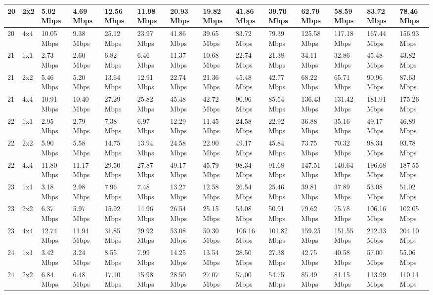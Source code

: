 \documentclass[12pt]{article}
\begin{document}
\begin{longtable}[c]{|l|l|l|l|l|l|l|l|l|l|l|l|l|l|}
20 & 2x2 & 5.02 Mbps & 4.69 Mbps & 12.56 Mbps & 11.98 Mbps & 20.93 Mbps & 19.82 Mbps & 41.86 Mbps & 39.70 Mbps & 62.79 Mbps & 58.59 Mbps & 83.72 Mbps & 78.46 Mbps \\ \hline
20 & 4x4 & 10.05 Mbps & 9.38 Mbps & 25.12 Mbps & 23.97 Mbps & 41.86 Mbps & 39.65 Mbps & 83.72 Mbps & 79.39 Mbps & 125.58 Mbps & 117.18 Mbps & 167.44 Mbps & 156.93 Mbps \\ \hline
21 & 1x1 & 2.73 Mbps & 2.60 Mbps & 6.82 Mbps & 6.46 Mbps & 11.37 Mbps & 10.68 Mbps & 22.74 Mbps & 21.38 Mbps & 34.11 Mbps & 32.86 Mbps & 45.48 Mbps & 43.82 Mbps \\ \hline
21 & 2x2 & 5.46 Mbps & 5.20 Mbps & 13.64 Mbps & 12.91 Mbps & 22.74 Mbps & 21.36 Mbps & 45.48 Mbps & 42.77 Mbps & 68.22 Mbps & 65.71 Mbps & 90.96 Mbps & 87.63 Mbps \\ \hline
21 & 4x4 & 10.91 Mbps & 10.40 Mbps & 27.29 Mbps & 25.82 Mbps & 45.48 Mbps & 42.72 Mbps & 90.96 Mbps & 85.54 Mbps & 136.43 Mbps & 131.42 Mbps & 181.91 Mbps & 175.26 Mbps \\ \hline
22 & 1x1 & 2.95 Mbps & 2.79 Mbps & 7.38 Mbps & 6.97 Mbps & 12.29 Mbps & 11.45 Mbps & 24.58 Mbps & 22.92 Mbps & 36.88 Mbps & 35.16 Mbps & 49.17 Mbps & 46.89 Mbps \\ \hline
22 & 2x2 & 5.90 Mbps & 5.58 Mbps & 14.75 Mbps & 13.94 Mbps & 24.58 Mbps & 22.90 Mbps & 49.17 Mbps & 45.84 Mbps & 73.75 Mbps & 70.32 Mbps & 98.34 Mbps & 93.78 Mbps \\ \hline
22 & 4x4 & 11.80 Mbps & 11.17 Mbps & 29.50 Mbps & 27.87 Mbps & 49.17 Mbps & 45.79 Mbps & 98.34 Mbps & 91.68 Mbps & 147.51 Mbps & 140.64 Mbps & 196.68 Mbps & 187.55 Mbps \\ \hline
23 & 1x1 & 3.18 Mbps & 2.98 Mbps & 7.96 Mbps & 7.48 Mbps & 13.27 Mbps & 12.58 Mbps & 26.54 Mbps & 25.46 Mbps & 39.81 Mbps & 37.89 Mbps & 53.08 Mbps & 51.02 Mbps \\ \hline
23 & 2x2 & 6.37 Mbps & 5.97 Mbps & 15.92 Mbps & 14.96 Mbps & 26.54 Mbps & 25.15 Mbps & 53.08 Mbps & 50.91 Mbps & 79.62 Mbps & 75.78 Mbps & 106.16 Mbps & 102.05 Mbps \\ \hline
23 & 4x4 & 12.74 Mbps & 11.94 Mbps & 31.85 Mbps & 29.92 Mbps & 53.08 Mbps & 50.30 Mbps & 106.16 Mbps & 101.82 Mbps & 159.25 Mbps & 151.55 Mbps & 212.33 Mbps & 204.10 Mbps \\ \hline
24 & 1x1 & 3.42 Mbps & 3.24 Mbps & 8.55 Mbps & 7.99 Mbps & 14.25 Mbps & 13.54 Mbps & 28.50 Mbps & 27.38 Mbps & 42.75 Mbps & 40.58 Mbps & 57.00 Mbps & 55.06 Mbps \\ \hline
24 & 2x2 & 6.84 Mbps & 6.48 Mbps & 17.10 Mbps & 15.98 Mbps & 28.50 Mbps & 27.07 Mbps & 57.00 Mbps & 54.75 Mbps & 85.49 Mbps & 81.15 Mbps & 113.99 Mbps & 110.11 Mbps \\ \hline

\end{longtable}
\end{document}
